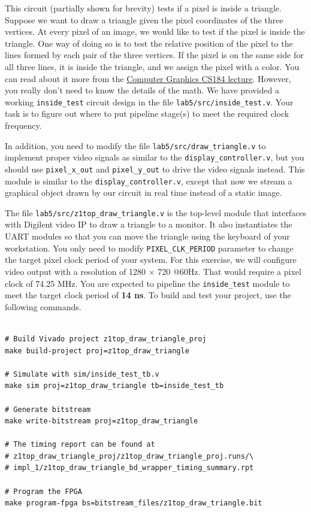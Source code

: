 \documentclass[11pt]{article}
\begin{document}
This circuit (partially shown for brevity) tests if a pixel is inside a triangle. Suppose we want to draw a triangle given the pixel coordinates of the three vertices. At every pixel of an image, we would like to test if the pixel is inside the triangle. One way of doing so is to test the relative position of the pixel to the lines formed by each pair of the three vertices. If the pixel is on the same side for all three lines, it is inside the triangle, and we assign the pixel with a color. You can read about it more from the \href{https://cs184.eecs.berkeley.edu/sp19/lecture/2/rasterization}{Computer Graphics CS184 lecture}. However, you really don't need to know the details of the math. We have provided a working \verb|inside_test| circuit design in the file \verb|lab5/src/inside_test.v|. Your task is to figure out where to put pipeline stage(s) to meet the required clock frequency.

In addition, you need to modify the file \verb|lab5/src/draw_triangle.v| to implement proper video signals as similar to the \verb|display_controller.v|, but you should use \verb|pixel_x_out| and \verb|pixel_y_out| to drive the video signals instead. This module is similar to the \verb|display_controller.v|, except that now we stream a graphical object drawn by our circuit in real time instead of a static image.

The file \verb|lab5/src/z1top_draw_triangle.v| is the top-level module that interfaces with Digilent video IP to draw a triangle to a monitor. It also instantiates the UART modules so that you can move the triangle using the keyboard of your workstation.
You only need to modify \verb|PIXEL_CLK_PERIOD| parameter to change the target pixel clock period of your system. For this exercise, we will configure video output with a resolution of 1280 $\times$ 720 @60Hz. That would require a pixel clock of 74.25 MHz. You are expected to pipeline the \verb|inside_test| module to meet the target clock period of \textbf{14 ns}. To build and test your project, use the following commands.

\begin{verbatim}

# Build Vivado project z1top_draw_triangle_proj
make build-project proj=z1top_draw_triangle

# Simulate with sim/inside_test_tb.v
make sim proj=z1top_draw_triangle tb=inside_test_tb

# Generate bitstream
make write-bitstream proj=z1top_draw_triangle

# The timing report can be found at
# z1top_draw_triangle_proj/z1top_draw_triangle_proj.runs/\
# impl_1/z1top_draw_triangle_bd_wrapper_timing_summary.rpt

# Program the FPGA
make program-fpga bs=bitstream_files/z1top_draw_triangle.bit
\end{verbatim}
\end{document}
